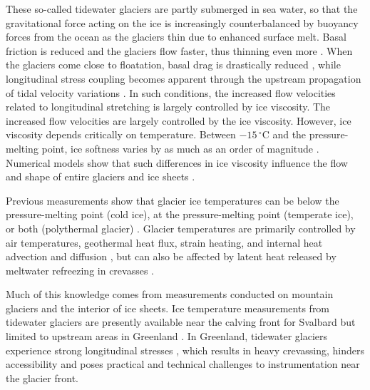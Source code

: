 \documentclass[utf8]{article}
\begin{document}
    These so-called tidewater glaciers are partly submerged in sea water, so
    that the gravitational force acting on the ice is increasingly
    counterbalanced by buoyancy forces from the ocean as the glaciers
    thin due to enhanced surface melt. Basal friction is
    reduced and the glaciers flow faster, thus thinning even more
    \citep{Meier.Post.1987}. When the glaciers come close to floatation,
    basal drag is drastically reduced \citep{Shapero.etal.2016},
    while longitudinal stress coupling becomes apparent through the upstream
    propagation of tidal velocity variations \citep{Walters.1989,
    Walter.etal.2012, Sugiyama.etal.2014, Podolskiy.etal.2017,
    Seddik.etal.2019}. In such conditions, the increased flow velocities
    related to longitudinal stretching is largely controlled by ice viscosity.
    The increased flow velocities are largely controlled by the ice viscosity.
    However, ice viscosity depends critically on temperature. Between
    $-15\,^\circ$C and the pressure-melting point, ice softness varies by as
    much as an order of magnitude \citep[p.~72]{Cuffey.Paterson.2010}.
    Numerical models show that such differences
    in ice viscosity influence the flow and shape of entire
    glaciers and ice sheets \citep[e.g.,][Figs.~2 and~7]{Seguinot.etal.2016}.

    Previous measurements show that glacier ice temperatures can be below
    the pressure-melting point (cold ice), at the pressure-melting point
    (temperate ice), or both (polythermal glacier)
    \citep[p.~399]{Ahlmann.1935, Cuffey.Paterson.2010}. Glacier temperatures
    are primarily controlled by air temperatures, geothermal heat flux, strain
    heating, and internal heat advection and diffusion \citep{Q-Robin.1955},
    but can also be affected by latent heat released by meltwater refreezing in
    crevasses \citep{Phillips.etal.2010, Phillips.etal.2013, Luthi.etal.2015}.

    Much of this knowledge comes from measurements conducted on mountain
    glaciers and the interior of ice sheets. Ice temperature measurements from
    tidewater glaciers are presently available near the calving front for
    Svalbard \citep{Jania.etal.1996} but limited to upstream areas in Greenland
    \citep{Iken.etal.1993, Luthi.etal.2002, Luthi.etal.2015, Doyle.etal.2018}.
    In Greenland, tidewater glaciers experience strong longitudinal stresses
    \citep[e.g.,][]{Fastook.etal.1995}, which results in heavy crevassing,
    hinders accessibility and poses practical and technical challenges to
    instrumentation near the glacier front.
\end{document}
